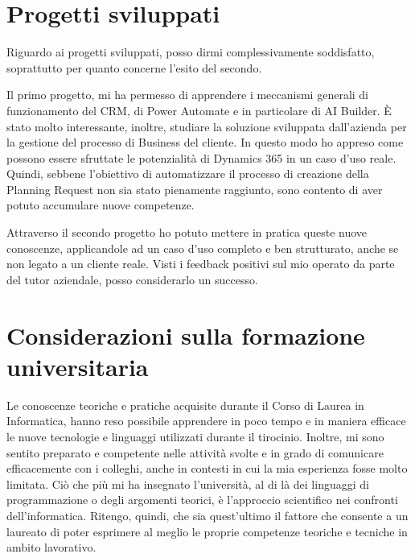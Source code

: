 \section{Progetti sviluppati}
Riguardo ai progetti sviluppati, posso dirmi complessivamente soddisfatto, soprattutto per quanto concerne l'esito del secondo. 

Il primo progetto, mi ha permesso di apprendere i meccanismi generali di funzionamento del CRM, di Power Automate e in particolare di AI Builder. È stato molto interessante, inoltre, studiare la soluzione sviluppata dall'azienda per la gestione del processo di Business del cliente. In questo modo ho appreso come possono essere sfruttate le potenzialità di Dynamics 365 in un caso d'uso reale.
Quindi, sebbene l'obiettivo di automatizzare il processo di creazione della Planning Request non sia stato pienamente raggiunto, sono contento di aver potuto accumulare nuove competenze.

Attraverso il secondo progetto ho potuto mettere in pratica queste nuove conoscenze, applicandole ad un caso d'uso completo e ben strutturato, anche se non legato a un cliente reale. Visti i feedback positivi sul mio operato da parte del tutor aziendale, posso considerarlo un successo.

\section{Considerazioni sulla formazione universitaria}
Le conoscenze teoriche e pratiche acquisite durante il Corso di Laurea in Informatica, hanno reso possibile apprendere in poco tempo e in maniera efficace le nuove tecnologie e linguaggi utilizzati durante il tirocinio. Inoltre, mi sono sentito preparato e competente nelle attività svolte e in grado di comunicare efficacemente con i colleghi, anche in contesti in cui la mia esperienza fosse molto limitata. 
Ciò che più mi ha insegnato l'università, al di là dei linguaggi di programmazione o degli argomenti teorici, è l'approccio scientifico nei confronti dell'informatica. Ritengo, quindi, che sia quest'ultimo il fattore che consente a un laureato di poter esprimere al meglio le proprie competenze teoriche e tecniche in ambito lavorativo.

\newpage\null\thispagestyle{empty}\newpage